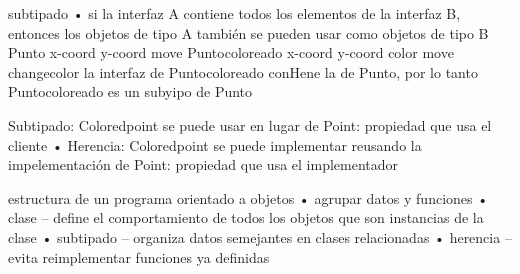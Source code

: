 \documentclass[10pt,a4paper]{report}
\begin{document}
\begin{itemize}
subtipado
•  si la interfaz A contiene todos los elementos de la interfaz B, entonces los 
objetos de tipo A también se pueden usar como objetos de tipo B
Punto
x-coord y-coord move
Puntocoloreado
x-coord y-coord
color
move changecolor
la interfaz de Puntocoloreado conHene la de Punto, por lo tanto Puntocoloreado es un subyipo de Punto 



Subtipado: Coloredpoint se puede usar en lugar de Point: propiedad que usa el cliente
•  Herencia: Coloredpoint se puede implementar reusando la impelementación de Point: propiedad que usa el implementador

estructura de un programa orientado a objetos
•  agrupar datos y funciones •  clase
– define el comportamiento de todos los objetos que son instancias de la clase
•  subtipado
– organiza datos semejantes en clases
relacionadas •  herencia
– evita reimplementar funciones ya definidas


\end{itemize}
\end{document}
